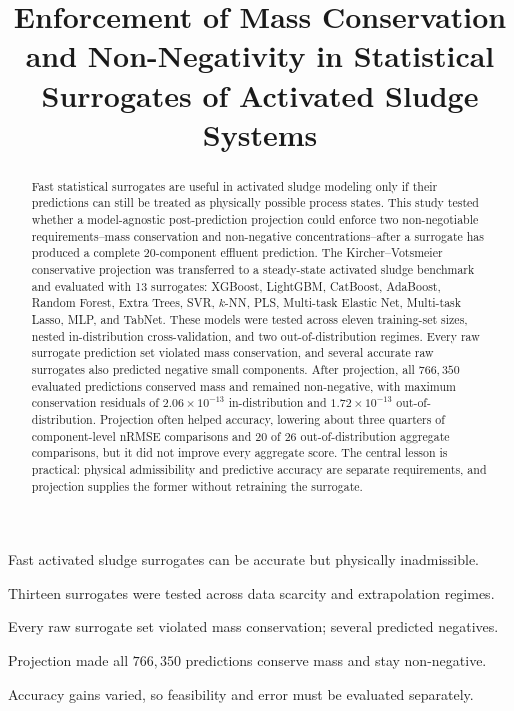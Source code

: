 \documentclass[a4paper,fleqn]{cas-sc}
\begin{document}
\let\WriteBookmarks\relax
\def\floatpagepagefraction{1}
\def\textpagefraction{.001}

\shortauthors{}

\title[mode=title]{Enforcement of Mass Conservation and Non-Negativity in Statistical Surrogates of Activated Sludge Systems}

\author{}

\begin{abstract}
Fast statistical surrogates are useful in activated sludge modeling only if their predictions can still be treated as physically possible process states. This study tested whether a model-agnostic post-prediction projection could enforce two non-negotiable requirements--mass conservation and non-negative concentrations--after a surrogate has produced a complete 20-component effluent prediction. The Kircher--Votsmeier conservative projection was transferred to a steady-state activated sludge benchmark and evaluated with 13 surrogates: XGBoost, LightGBM, CatBoost, AdaBoost, Random Forest, Extra Trees, SVR, $k$-NN, PLS, Multi-task Elastic Net, Multi-task Lasso, MLP, and TabNet. These models were tested across eleven training-set sizes, nested in-distribution cross-validation, and two out-of-distribution regimes. Every raw surrogate prediction set violated mass conservation, and several accurate raw surrogates also predicted negative small components. After projection, all $766{,}350$ evaluated predictions conserved mass and remained non-negative, with maximum conservation residuals of $2.06\times10^{-13}$ in-distribution and $1.72\times10^{-13}$ out-of-distribution. Projection often helped accuracy, lowering about three quarters of component-level nRMSE comparisons and 20 of 26 out-of-distribution aggregate comparisons, but it did not improve every aggregate score. The central lesson is practical: physical admissibility and predictive accuracy are separate requirements, and projection supplies the former without retraining the surrogate.
\end{abstract}

\begin{highlights}
\item Fast activated sludge surrogates can be accurate but physically inadmissible.
\item Thirteen surrogates were tested across data scarcity and extrapolation regimes.
\item Every raw surrogate set violated mass conservation; several predicted negatives.
\item Projection made all $766{,}350$ predictions conserve mass and stay non-negative.
\item Accuracy gains varied, so feasibility and error must be evaluated separately.
\end{highlights}
\end{document}
